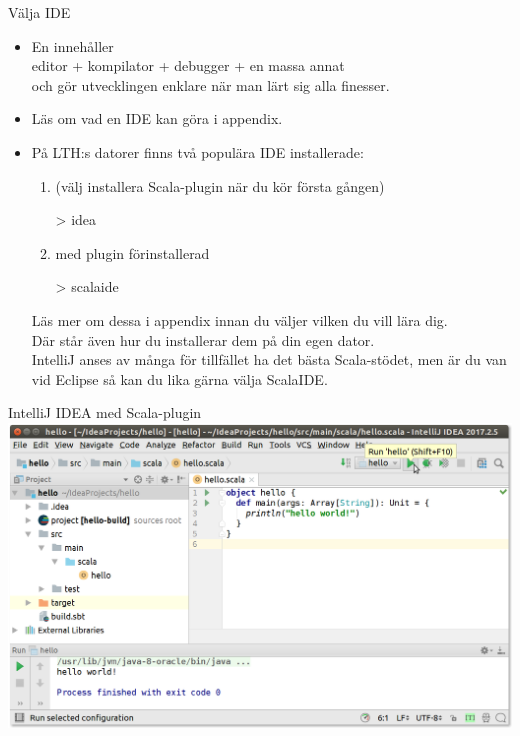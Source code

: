 

\begin{Slide}{Välja IDE}\SlideFontSmall
\begin{itemize}
\item En   innehåller \\ editor + kompilator + debugger + en massa annat\\och gör utvecklingen enklare när man lärt sig alla finesser.

\item Läs om vad en IDE kan göra i appendix.

\pause

\item På LTH:s datorer finns två populära IDE installerade:
\begin{enumerate}\SlideFontSmall

\item {} (välj installera Scala-plugin när du kör första gången)
\begin{REPL}[numbers=none]
> idea
\end{REPL}

\item {} med plugin  förinstallerad
\begin{REPL}[numbers=none]
> scalaide
\end{REPL}

\end{enumerate}
Läs mer om dessa i appendix innan du väljer vilken du vill lära dig.
\\Där står även hur du installerar dem på din egen dator.
\\IntelliJ anses av många för tillfället ha det bästa Scala-stödet, men är du van vid Eclipse så kan du lika gärna välja ScalaIDE.
\end{itemize}
\end{Slide}

\begin{Slide}{IntelliJ IDEA med Scala-plugin}
\includegraphics[width=\textwidth]{../img/intellij/idea-hello.png}
\end{Slide}

